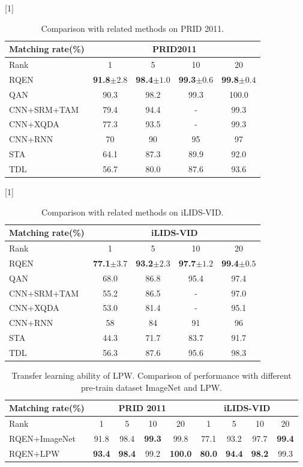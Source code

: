 \documentclass[letterpaper]{article} %
\begin{document}
\begin{table}[t]
\centering
\caption{Comparison with related methods on PRID 2011.}
\scalebox{0.8}[1]{
\begin{tabular}{l|c|c|c|c}
\hline
  Matching rate(\%)& \multicolumn{4}{c}{PRID2011} \\
  \hline
  Rank & 1 & 5 & 10 & 20 \\
\hline
RQEN & {\bf91.8$\pm2.8$} & {\bf98.4$\pm1.0$} & {\bf99.3$\pm0.6$} & {\bf99.8$\pm0.4$} \\
\hline
QAN& 90.3 & 98.2 & 99.3 & 100.0 \\
CNN+SRM+TAM&79.4 &94.4 &-&99.3 \\
CNN+XQDA & 77.3 & 93.5 & - & 99.3 \\
CNN+RNN & 70 & 90 & 95 & 97 \\
STA& 64.1 & 87.3 & 89.9 & 92.0 \\
TDL & 56.7 & 80.0 & 87.6 & 93.6 \\
\hline
\end{tabular}}

\label{table:prid2011_performance}
\end{table}

\begin{table}[t]
\centering
\caption{Comparison with related methods on iLIDS-VID.}
\scalebox{0.8}[1]{
\begin{tabular}{l|c|c|c|c}
\hline
  Matching rate(\%)& \multicolumn{4}{c}{iLIDS-VID} \\
  \hline
  Rank & 1 & 5 & 10 & 20 \\
\hline
RQEN & {\bf77.1$\pm3.7$} & {\bf93.2$\pm2.3$} & {\bf97.7$\pm1.2$} & {\bf99.4$\pm0.5$} \\
\hline
QAN& 68.0 & 86.8 & 95.4 & 97.4 \\
CNN+SRM+TAM&55.2&86.5&-&97.0 \\
CNN+XQDA& 53.0 & 81.4 & - & 95.1 \\
CNN+RNN& 58 & 84 & 91 & 96 \\
STA& 44.3 & 71.7 & 83.7 & 91.7 \\
TDL& 56.3 & 87.6 & 95.6 & 98.3 \\
\hline
\end{tabular}}
\label{table:ilids2011}
\end{table}



\begin{table}[t]
\centering
\caption{Transfer learning ability of LPW. Comparison of performance with different pre-train dataset ImageNet and LPW.}
\begin{tabular}{l|c|c|c|c|c|c|c|c}
\hline
Matching rate(\%)& \multicolumn{4}{c}{PRID 2011}&\multicolumn{4}{c}{iLIDS-VID}  \\
\hline
 Rank & 1 & 5 & 10 & 20 & 1 & 5 & 10 & 20\\
\hline
RQEN+ImageNet & 91.8 & 98.4& \bf{99.3} & 99.8 & 77.1 & 93.2 & 97.7 & \bf{99.4}\\
RQEN+LPW & \bf{93.4} & \bf{98.4} & 99.2 & \bf{100.0} & \bf{80.0} & \bf{94.4} & \bf{98.2} & 99.3\\
\hline
\end{tabular}
\label{table:eva}
\end{table}
\end{document}
